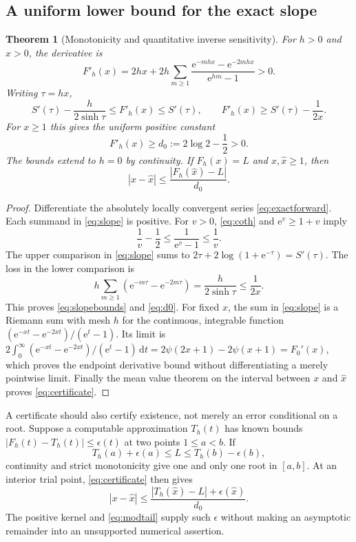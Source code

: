 \documentclass[11pt,a4paper]{article}
\newtheorem{theorem}{Theorem}[section]
\theoremstyle{definition}
\theoremstyle{remark}
\newcommand{\e}{\mathrm e}
\newcommand{\dd}{\,\mathrm d}
\begin{document}
\subsection{A uniform lower bound for the exact slope}
\begin{theorem}[Monotonicity and quantitative inverse sensitivity]
\label{thm:slope}
For $h>0$ and $x>0$, the derivative is
\begin{equation}
 F'_h(x)=2hx+2h\sum_{m\ge1}
           \frac{\e^{-mhx}-\e^{-2mhx}}{\e^{hm}-1}>0.
 \label{eq:slope}
\end{equation}
Writing $\tau=hx$,
\begin{equation}
 S'(\tau)-\frac{h}{2\sinh\tau}
 \le F'_h(x)\le S'(\tau),
 \qquad
 F'_h(x)\ge S'(\tau)-\frac1{2x}.
 \label{eq:slopebounds}
\end{equation}
For $x\ge1$ this gives the uniform positive constant
\begin{equation}
 F'_h(x)\ge d_0:=2\log2-\frac12>0.
 \label{eq:d0}
\end{equation}
The bounds extend to $h=0$ by continuity. If $F_h(x)=L$ and
$x,\widehat x\ge1$, then
\begin{equation}
 |x-\widehat x|\le\frac{|F_h(\widehat x)-L|}{d_0}.
 \label{eq:certificate}
\end{equation}
\end{theorem}
\begin{proof}
Differentiate the absolutely locally convergent series
\eqref{eq:exactforward}. Each summand in \eqref{eq:slope} is positive.
For $v>0$, \eqref{eq:coth} and $\e^v\ge1+v$ imply
\[
 \frac1v-\frac12\le\frac1{\e^v-1}\le\frac1v.
\]
The upper comparison in \eqref{eq:slope} sums to
$2\tau+2\log(1+\e^{-\tau})=S'(\tau)$. The loss in the lower comparison is
\[
 h\sum_{m\ge1}(\e^{-m\tau}-\e^{-2m\tau})
 =\frac{h}{2\sinh\tau}\le\frac1{2x}.
\]
This proves \eqref{eq:slopebounds} and \eqref{eq:d0}. For fixed $x$, the sum in \eqref{eq:slope} is a Riemann sum
with mesh $h$ for the continuous, integrable function
$(\e^{-xt}-\e^{-2xt})/(\e^t-1)$. Its limit is
$2\int_0^\infty(\e^{-xt}-\e^{-2xt})/(\e^t-1)\dd t
=2\psi(2x+1)-2\psi(x+1)=F_0'(x)$,
which proves the endpoint derivative bound without differentiating a
merely pointwise limit. Finally the mean value
theorem on the interval between $x$ and $\widehat x$ proves
\eqref{eq:certificate}.
\end{proof}

A certificate should also certify existence, not merely an error
conditional on a root. Suppose a computable approximation $T_h(t)$ has
known bounds $|F_h(t)-T_h(t)|\le\epsilon(t)$ at two points $1\le a<b$.
If
\begin{equation}
 T_h(a)+\epsilon(a)\le L\le T_h(b)-\epsilon(b),
 \label{eq:existbracket}
\end{equation}
continuity and strict monotonicity give one and only one root in $[a,b]$.
At an interior trial point, \eqref{eq:certificate} then gives
\[
 |x-\widehat x|\le
 \frac{|T_h(\widehat x)-L|+\epsilon(\widehat x)}{d_0}.
\]
The positive kernel and \eqref{eq:modtail} supply such $\epsilon$ without
making an asymptotic remainder into an unsupported numerical assertion.
\end{document}
